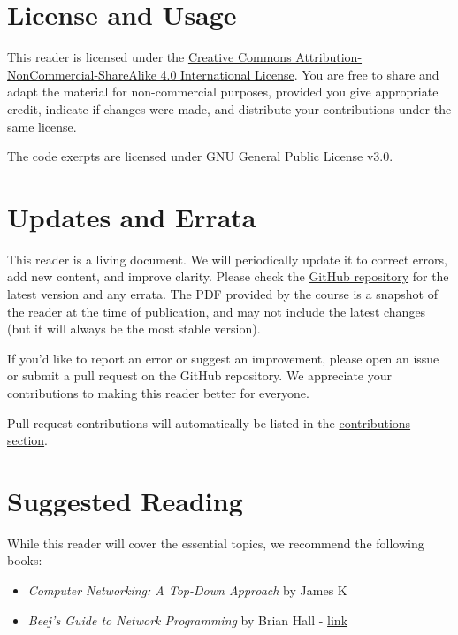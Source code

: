 \section*{License and Usage}
This reader is licensed under the \href{https://creativecommons.org/licenses/by-nc-sa/4.0/}{Creative Commons Attribution-NonCommercial-ShareAlike 4.0 International License}. You are free to share and adapt the material for non-commercial purposes, provided you give appropriate credit, indicate if changes were made, and distribute your contributions under the same license.

The code exerpts are licensed under GNU General Public License v3.0.

\section*{Updates and Errata}
This reader is a living document. We will periodically update it to correct errors, add new content, and improve clarity. Please check the \href{https://github.com/Code-For-Groningen/CN-Reader}{GitHub repository} for the latest version and any errata. The PDF provided by the course is a snapshot of the reader at the time of publication, and may not include the latest changes (but it will always be the most stable version).

If you'd like to report an error or suggest an improvement, please open an issue or submit a pull request on the GitHub repository. We appreciate your contributions to making this reader better for everyone. 

Pull request contributions will automatically be listed in the \hyperref[sec:contributions]{contributions section}.


\section*{Suggested Reading}
While this reader will cover the essential topics, we recommend the following books:
\begin{itemize}
    \item \textit{Computer Networking: A Top-Down Approach} by James K
    \item \textit{Beej's Guide to Network Programming} by Brian Hall - \href{https://beej.us/guide/bgnet/}{link}
\end{itemize}
